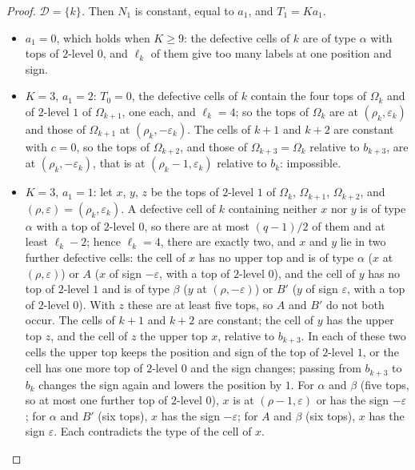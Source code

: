 \begin{proof}
\emph{$\mathcal D=\{k\}$.} Then $N_{1}$ is constant, equal to $a_{1}$, and
$T_{1}=Ka_{1}$.
\begin{itemize}
\item $a_{1}=0$, which holds when $K\ge9$: the defective cells of $k$ are of
type $\alpha$ with tops of $2$-level $0$, and $\ell_{k}$ of them give too
many labels at one position and sign.
\item $K=3$, $a_{1}=2$: $T_{0}=0$, the defective cells of $k$ contain the four
tops of $\Omega_{k}$ and of $2$-level $1$ of $\Omega_{k+1}$, one each, and
$\ell_{k}=4$; so the tops of $\Omega_{k}$ are at $(\rho_{k},\varepsilon_{k})$
and those of $\Omega_{k+1}$ at $(\rho_{k},-\varepsilon_{k})$. The cells of
$k+1$ and $k+2$ are constant with $c=0$, so the tops of $\Omega_{k+2}$, and
those of $\Omega_{k+3}=\Omega_{k}$ relative to $b_{k+3}$, are at
$(\rho_{k},-\varepsilon_{k})$, that is at $(\rho_{k}-1,\varepsilon_{k})$
relative to $b_{k}$: impossible.
\item $K=3$, $a_{1}=1$: let $x$, $y$, $z$ be the tops of $2$-level $1$ of
$\Omega_{k}$, $\Omega_{k+1}$, $\Omega_{k+2}$, and
$(\rho,\varepsilon)=(\rho_{k},\varepsilon_{k})$. A defective cell of $k$
containing neither $x$ nor $y$ is of type $\alpha$ with a top of $2$-level
$0$, so there are at most $(q-1)/2$ of them and at least $\ell_{k}-2$;
hence $\ell_{k}=4$, there are exactly two, and $x$ and $y$ lie in two further defective cells: the cell of
$x$ has no upper top and is of type $\alpha$ ($x$ at $(\rho,\varepsilon)$) or
$A$ ($x$ of sign $-\varepsilon$, with a top of $2$-level $0$), and the cell
of $y$ has no top of $2$-level $1$ and is of type $\beta$ ($y$ at
$(\rho,-\varepsilon)$) or $B'$ ($y$ of sign $\varepsilon$, with a top of
$2$-level $0$). With $z$ these are at least five tops, so $A$ and $B'$ do not
both occur. The cells of $k+1$ and $k+2$ are constant; the cell of $y$ has
the upper top $z$, and the cell of $z$ the upper top $x$, relative to
$b_{k+3}$. In each of these two cells the upper top keeps the position and
sign of the top of $2$-level $1$, or the cell has one more top of $2$-level
$0$ and the sign changes; passing from $b_{k+3}$ to $b_{k}$ changes the sign
again and lowers the position by $1$. For $\alpha$ and $\beta$ (five tops, so
at most one further top of $2$-level $0$), $x$ is at $(\rho-1,\varepsilon)$
or has the sign $-\varepsilon$; for $\alpha$ and $B'$ (six tops), $x$ has the
sign $-\varepsilon$; for $A$ and $\beta$ (six tops), $x$ has the sign
$\varepsilon$. Each contradicts the type of the cell of $x$.
\end{itemize}


\end{proof}
